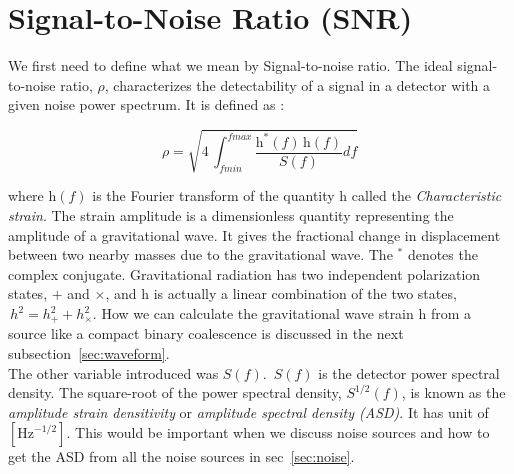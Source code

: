 \documentclass[11pt,fleqn]{book} %
\begin{document}
\section{Signal-to-Noise Ratio (SNR)}

We first need to define what we mean by Signal-to-noise ratio. The ideal signal-to-noise ratio, $\rho$, characterizes the detectability of a signal in a detector with a given noise power spectrum. It is defined as :

\begin{equation}\label{eq:rho}
	\rho = \sqrt{4 \, \int^{fmax} _{fmin} \frac{\text{\~ h}^{*}(f) \, \text{\~ h}(f)}{S(f)} df}
\end{equation}




where $\text{\~ h}(f)$ is the Fourier transform of the quantity h  called the \emph{Characteristic strain}. The strain amplitude is a dimensionless quantity representing the amplitude of a gravitational wave. It gives the fractional change in displacement between two nearby masses due to the gravitational wave. The $^*$ denotes the complex conjugate. Gravitational radiation has two independent polarization states, $+$ and $\times$, and h is actually a linear combination of the two states, $\, h^2 = h_{+}^2 + h_{\times}^2$. How we can calculate the gravitational wave strain h from a source like a compact binary coalescence is discussed in the next subsection~\ref{sec:waveform}.\\

The other variable introduced was $S(f)$. $\, S(f)$ is the detector power spectral density. The square-root of the power spectral density, $S^{1/2}(f)$, is known as the \emph{amplitude strain densitivity} or \emph{amplitude spectral density (ASD)}.  It has unit of $ [ \text{Hz}^{-1/2} ] $. This would be important when we discuss noise sources and how to get the ASD from all the noise sources in sec~\ref{sec:noise}.







\begin{comment}
\begin{equation}
	h_f = \sqrt{5 \times \pi / 24.}\times G^2 \times M_{chirp}^2/(c^5 \times Dist)\times (\frac{\pi \times G \times M_{chirp} \times fI}{c^3})^{-7./6.}
\end{equation}

The goal and quantifible. 

Waveform

detector: antenna

Noise

Source: ra ande dec and distance
\end{comment}
\end{document}
